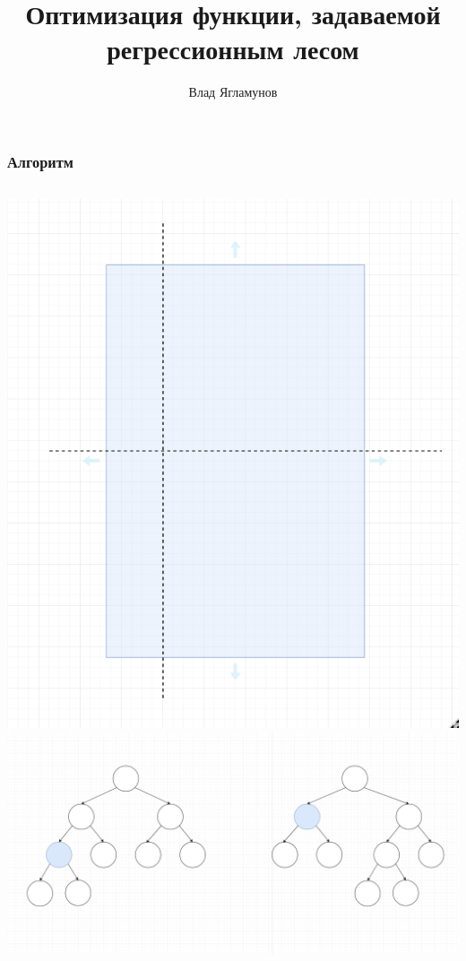 \documentclass{beamer}
\title{Оптимизация функции, задаваемой регрессионным лесом}
\author{Влад Ягламунов}
\date{}
\begin{document}
\maketitle

\begin{frame}
\frametitle{Алгоритм}
\begin{columns}
    \includegraphics[width=\textwidth]{split.png}
    \includegraphics[width=\textwidth]{tree.png}
\end{columns}
\end{frame}
\end{document}
